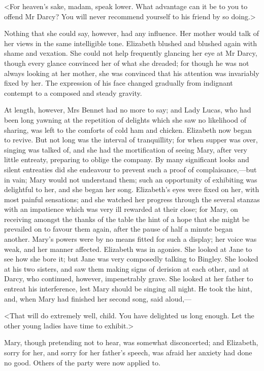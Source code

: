 <For heaven's sake, madam, speak lower. What advantage can it be to you to offend Mr Darcy? You will never recommend yourself to his friend by so doing.>

Nothing that she could say, however, had any influence. Her mother would talk of her views in the same intelligible tone. Elizabeth blushed and blushed again with shame and vexation. She could not help frequently glancing her eye at Mr Darcy, though every glance convinced her of what she dreaded; for though he was not always looking at her mother, she was convinced that his attention was invariably fixed by her. The expression of his face changed gradually from indignant contempt to a composed and steady gravity.

At length, however, Mrs Bennet had no more to say; and Lady Lucas, who had been long yawning at the repetition of delights which she saw no likelihood of sharing, was left to the comforts of cold ham and chicken. Elizabeth now began to revive. But not long was the interval of tranquillity; for when supper was over, singing was talked of, and she had the mortification of seeing Mary, after very little entreaty, preparing to oblige the company. By many significant looks and silent entreaties did she endeavour to prevent such a proof of complaisance,—but in vain; Mary would not understand them; such an opportunity of exhibiting was delightful to her, and she began her song. Elizabeth's eyes were fixed on her, with most painful sensations; and she watched her progress through the several stanzas with an impatience which was very ill rewarded at their close; for Mary, on receiving amongst the thanks of the table the hint of a hope that she might be prevailed on to favour them again, after the pause of half a minute began another. Mary's powers were by no means fitted for such a display; her voice was weak, and her manner affected. Elizabeth was in agonies. She looked at Jane to see how she bore it; but Jane was very composedly talking to Bingley. She looked at his two sisters, and saw them making signs of derision at each other, and at Darcy, who continued, however, impenetrably grave. She looked at her father to entreat his interference, lest Mary should be singing all night. He took the hint, and, when Mary had finished her second song, said aloud,—

<That will do extremely well, child. You have delighted us long enough. Let the other young ladies have time to exhibit.>

Mary, though pretending not to hear, was somewhat disconcerted; and Elizabeth, sorry for her, and sorry for her father's speech, was afraid her anxiety had done no good. Others of the party were now applied to.

